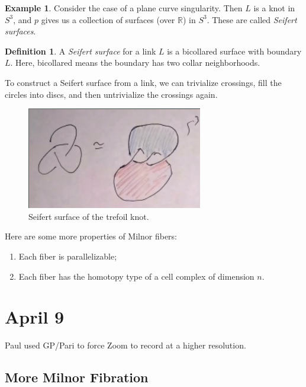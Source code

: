 \documentclass[leqno, openany]{memoir}
\theoremstyle{definition}
\newtheorem{defn}[thm]{Definition}
\newtheorem{exm}[thm]{Example}
\theoremstyle{remark}
\theoremstyle{plain}
\theoremstyle{definition}
\theoremstyle{remark}
\newcommand{\R}{\mathbb{R}}
\begin{document}
\begin{exm}
    Consider the case of a plane curve singularity. Then $L$ is a knot in $S^3$, and $p$ gives us a collection of surfaces (over $\R$) in $S^3$. These are called \textit{Seifert surfaces}.
\end{exm}

\begin{defn}
    A \textit{Seifert surface} for a link $L$ is a bicollared surface with boundary $L$. Here, bicollared means the boundary has two collar neighborhoods.
\end{defn}

To construct a Seifert surface from a link, we can trivialize crossings, fill the circles into discs, and then untrivialize the crossings again.

\begin{figure}[H]
    \centering
    \includegraphics[width=0.8\linewidth]{seifert}
    \caption{Seifert surface of the trefoil knot.}%
    \label{fig:seifert}
\end{figure}

Here are some more properties of Milnor fibers:
\begin{enumerate}
    \item Each fiber is parallelizable;
    \item Each fiber has the homotopy type of a cell complex of dimension $n$.
\end{enumerate}

\chapter{April 9}%
\label{cha:april_9}

Paul used GP/Pari to force Zoom to record at a higher resolution.

\section{More Milnor Fibration}%
\label{sec:more_milnor_fibration}
\end{document}
